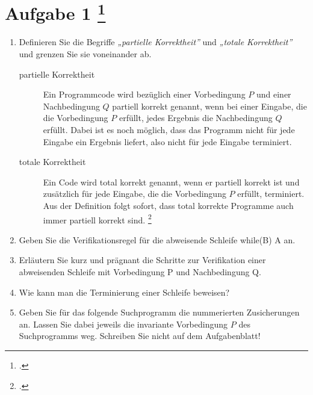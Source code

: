 \documentclass{lehramt-informatik-aufgabe}
\begin{document}
\section{Aufgabe 1
\footcite{66116:2020:09}}

\begin{enumerate}


\item Definieren Sie die Begriffe \emph{„partielle Korrektheit”} und
\emph{„totale Korrektheit”} und grenzen Sie sie voneinander ab.

\begin{liAntwort}
\begin{description}
\item[partielle Korrektheit]

Ein Programmcode wird bezüglich einer Vorbedingung $P$ und einer
Nachbedingung $Q$ partiell korrekt genannt, wenn bei einer Eingabe, die
die Vorbedingung $P$ erfüllt, jedes Ergebnis die Nachbedingung $Q$
erfüllt. Dabei ist es noch möglich, dass das Programm nicht für jede
Eingabe ein Ergebnis liefert, also nicht für jede Eingabe terminiert.

\item[totale Korrektheit]

Ein Code wird total korrekt genannt, wenn er partiell korrekt ist und
zusätzlich für jede Eingabe, die die Vorbedingung $P$ erfüllt,
terminiert. Aus der Definition folgt sofort, dass total korrekte
Programme auch immer partiell korrekt sind.
\footcite{wiki:korrektheit}
\end{description}
\end{liAntwort}


\item Geben Sie die Verifikationsregel für die abweisende Schleife
while(B) A an.


\item Erläutern Sie kurz und prägnant die Schritte zur Verifikation
einer abweisenden Schleife mit Vorbedingung P und Nachbedingung Q.


\item Wie kann man die Terminierung einer Schleife beweisen?


\item Geben Sie für das folgende Suchprogramm die nummerierten
Zusicherungen an. Lassen Sie dabei jeweils die invariante Vorbedingung
$P$ des Suchprogramms weg. Schreiben Sie nicht auf dem Aufgabenblatt!


\end{enumerate}
\end{document}
